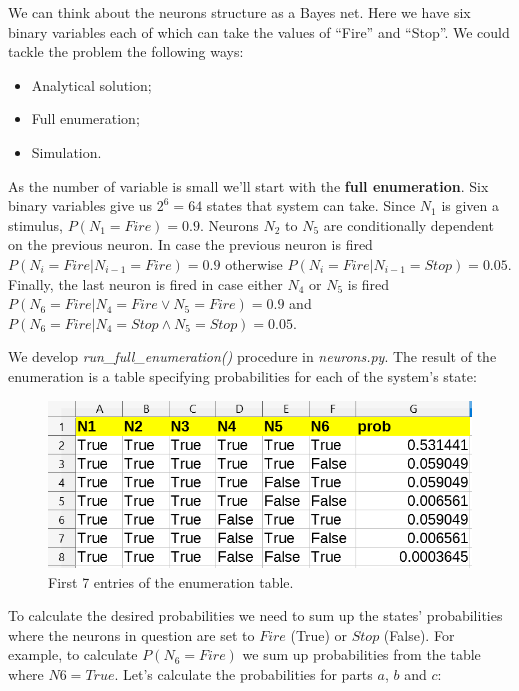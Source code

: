 \documentclass[a4 paper]{article}
\begin{document}
	




We can think about the neurons structure as
a Bayes net. Here we have six binary variables
each of which can take the values of 
``Fire'' and ``Stop''. We could tackle 
the problem the following ways:

\begin{itemize}
	\item Analytical solution;
	\item Full enumeration;
	\item Simulation.
\end{itemize}

As the number of variable is small we'll
start with the \textbf{full enumeration}.
Six binary variables give us 
$2^6=64$ states that system can take.
Since $N_1$ is given a stimulus, 
$P(N_1=Fire)=0.9$. Neurons
$N_2$ to $N_5$ are conditionally dependent 
on the previous neuron. In case
the previous neuron is fired 
$P(N_i=Fire|N_{i-1}=Fire)=0.9$
otherwise $P(N_i=Fire|N_{i-1}=Stop)=0.05$.
Finally, the last neuron is fired 
in case either $N_4$ or $N_5$
is fired 
$P(N_6=Fire|N_4=Fire \lor N_5=Fire)=0.9$
and
$P(N_6=Fire|N_4=Stop \land N_5=Stop)=0.05$.


We develop \textit{run\_full\_enumeration()}
procedure in \textit{neurons.py}. The result 
of the enumeration is a table 
specifying probabilities for 
each of the system's state:

\begin{figure}[H]
	\includegraphics[scale=1.0]{table}
	\centering
	\caption{First 7 entries of the enumeration table.}
	\label{table}
\end{figure}

To calculate the desired probabilities we 
need to sum up the states' probabilities 
where the neurons in question are set 
to $Fire$ (True) or $Stop$ (False).
For example, to calculate $P(N_6=Fire)$
we sum up probabilities from the table 
where $N6=True$. Let's calculate 
the probabilities for parts $a$, $b$ and $c$: 
\end{document}
